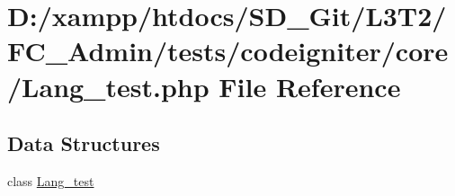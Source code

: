 \hypertarget{_admin_2tests_2codeigniter_2core_2_lang__test_8php}{}\section{D\+:/xampp/htdocs/\+S\+D\+\_\+\+Git/\+L3\+T2/\+F\+C\+\_\+\+Admin/tests/codeigniter/core/\+Lang\+\_\+test.php File Reference}
\label{_admin_2tests_2codeigniter_2core_2_lang__test_8php}
\subsection*{Data Structures}
\begin{DoxyCompactItemize}
\item 
class \hyperlink{class_lang__test}{Lang\+\_\+test}
\end{DoxyCompactItemize}
